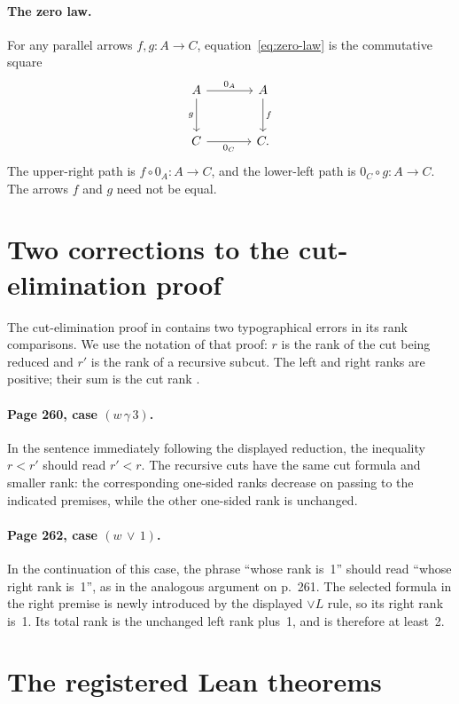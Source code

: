 \documentclass[11pt]{article}
\begin{document}
\paragraph{The zero law.}
For any parallel arrows $f,g:A\to C$,
equation~\eqref{eq:zero-law} is the commutative square
\[
\begin{tikzcd}[column sep=large,row sep=large]
 A\arrow[r,"0_A"]\arrow[d,"g"']&A\arrow[d,"f"]\\
 C\arrow[r,"0_C"']&C.
\end{tikzcd}
\]
The upper-right path is $f\circ0_A:A\to C$, and the lower-left
path is $0_C\circ g:A\to C$. The arrows $f$ and $g$ need not be equal.

\clearpage
\section{Two corrections to the cut-elimination proof}\label{app:cut-errata}

The cut-elimination proof in \cite[\S11.2]{DP} contains two
typographical errors in its rank comparisons. We use the notation of
that proof: $r$ is the rank of the cut being reduced and $r'$ is the
rank of a recursive subcut. The left and right ranks are positive;
their sum is the cut rank \cite[p.~249]{DP}.

\paragraph{Page 260, case $(w\,\gamma\,3)$.}
In the sentence immediately following the displayed reduction,
the inequality $r<r'$ should read $r'<r$.
The recursive cuts have the same cut formula and smaller rank:
the corresponding one-sided ranks decrease on passing to the
indicated premises, while the other one-sided rank is unchanged.

\paragraph{Page 262, case $(w\,\vee\,1)$.}
In the continuation of this case, the phrase ``whose rank is~1''
should read ``whose right rank is~1'', as in the analogous
argument on p.~261. The selected formula in the right premise
is newly introduced by the displayed $\vee L$ rule, so its right
rank is~1. Its total rank is the unchanged left rank plus~1,
and is therefore at least~2.

\section{The registered Lean theorems}\label{app:lean-statements}
\end{document}
